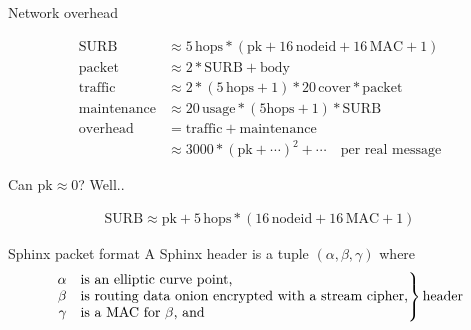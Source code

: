 \documentclass[fleqn,xcolor={usenames,dvipsnames},notes,aspectratio=169]{beamer} %
\begin{document}
\begin{frame}{Network overhead}

\begin{align*}
\mathrm{SURB} &\approx 5\,\mathrm{hops} * (\mathrm{pk} + 16\,\mathrm{nodeid} + 16\,\mathrm{MAC} + 1) \\
\mathrm{packet} &\approx 2 * \mathrm{SURB} + \mathrm{body} \\
\mathrm{traffic} &\approx 2 * (5\,\mathrm{hops} + 1) * 20\,\mathrm{cover} * \mathrm{packet} \\
\mathrm{maintenance} &\approx 20\,\mathrm{usage} * (5 \mathrm{hops} + 1) *  \mathrm{SURB} \\
\mathrm{overhead} &= \mathrm{traffic} + \mathrm{maintenance} \\
 &\approx 3000 * (\mathrm{pk} + \cdots)^2 + \cdots \quad\textrm{per real message}
\end{align*}

\bigskip\pause

Can $\mathrm{pk} \approx 0$?  Well..

\begin{align*}
\mathrm{SURB} \approx \mathrm{pk} + 5\,\mathrm{hops} * (16\, \mathrm{nodeid} + 16\,\mathrm{MAC} + 1) 
\end{align*}

\end{frame}


\begin{frame}{Sphinx packet format}
A Sphinx header is a tuple $(\alpha,\beta,\gamma)$ where \\

 \vspace*{-18pt} \[
\left. \begin{array}{@{}rl@{}}
  \alpha & \text{is an elliptic curve point,}\\
  \beta & \text{is routing data onion encrypted with a stream cipher,}\\
  \gamma & \text{is a MAC for $\beta$, and} \\
\end{array} \right\} \text{header}
\]  %

\def\svgwidth{\columnwidth}


\end{frame}
\end{document}
